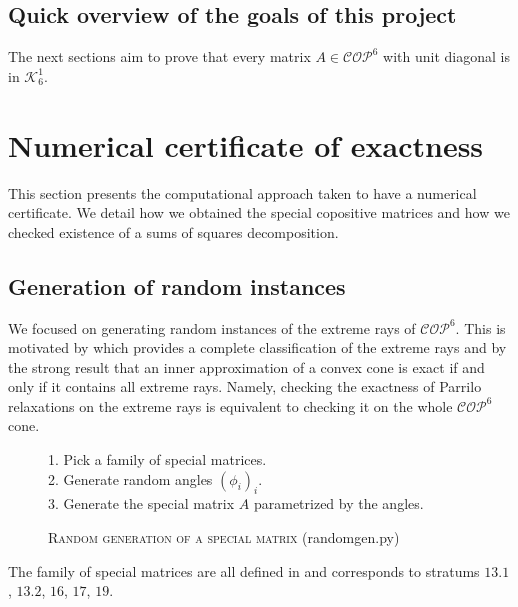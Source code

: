 \documentclass[onecolumn,11pt,a4paper]{article}
\theoremstyle{plain}  %
\theoremstyle{remark}  %
\providecommand*{\hr}[1][class-arg]{%
    \hspace*{\fill}\hrulefill\hspace*{\fill}
    \vskip 0.65\baselineskip
}
\begin{document}
\subsection{Quick overview of the goals of this project}
The next sections aim to prove that every matrix $A \in \mathcal{COP}^6$ with unit diagonal is in $\mathcal{K}_6^1$.
\newpage
\section{Numerical certificate of exactness}
\label{sec:computation}
This section presents the computational approach taken to have a numerical certificate.
We detail how we obtained the special copositive matrices and how we checked existence of a sums of squares decomposition.
\subsection{Generation of random instances}
\label{sub:generation}
We focused on generating random instances of the extreme rays of $\mathcal{COP}^6$. This is motivated by \cite{afonin2020extreme} which provides
a complete classification of the extreme rays and by the strong result that an inner approximation of a convex cone is exact if and only if
it contains all extreme rays. Namely, checking the exactness of Parrilo relaxations on the extreme rays is equivalent to checking it on the whole $\mathcal{COP}^6$ cone.
\begin{figure}[h!]
	\begin{framed}
		1. Pick a family of special matrices.\\
		2. Generate random angles $(\phi_i)_i$.\\
		3. Generate the special matrix $A$ parametrized by the angles.
	\end{framed}
	\caption{\textsc{Random generation of a special matrix} (randomgen.py)}
	\label{algo:random-instances}
\end{figure}

The family of special matrices are all defined in \cite{afonin2020extreme} 
and corresponds to stratums $13.1$, $13.2$, $16$, $17$, $19$.
\end{document}
